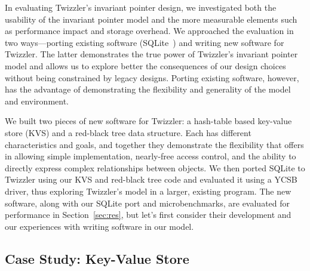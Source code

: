 In evaluating Twizzler's invariant pointer design, we investigated both the
usability of the invariant pointer model and the more measurable elements such as performance impact
and storage overhead. We approached the evaluation in two ways---porting existing software
(SQLite~\cite{sqlite}) and writing new software for Twizzler. The latter demonstrates the true power of
Twizzler's invariant pointer model and allows us to explore better the consequences of our design
choices without being constrained by legacy designs. Porting existing software, however, has the
advantage of demonstrating the flexibility and generality of the model and environment.

We built two pieces of new software for Twizzler: a hash-table based key-value store (KVS) and a red-black tree
data structure.  Each has different characteristics and goals, and together they demonstrate the flexibility that
\Twizzler offers in allowing simple implementation, nearly-free access control, and the ability to directly express
complex relationships between objects.  We then ported SQLite to Twizzler using
our KVS and red-black tree code and evaluated it using a YCSB~\cite{ycsb,ycsbc} driver, thus exploring Twizzler's
model in a larger, existing program. The new software, along with our SQLite port and
microbenchmarks, are evaluated for performance in Section~\ref{sec:res}, but let's first consider their development and our experiences with writing software in our model.


\subsection{Case Study: Key-Value Store}


\label{sec:kv}


